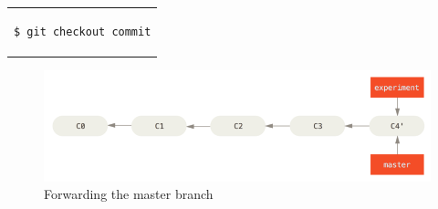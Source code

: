 \documentclass[12pt,a4paper]{article}
\begin{document}
\begin{center}
\begin{tabular}{c}
\begin{lstlisting}[language=bash]
  $ git checkout commit
\end{lstlisting}
\end{tabular}
\end{center}
If I want to do an experiment I usually create a new branch to experiment on.
\begin{center}
\begin{tabular}{c}
\begin{lstlisting}[language=bash]
$ git branch experiment
# creates a new branch called experiment
$ git checkout experiment
# checks out the experiment branch which means that
# the user is working now on this branch  
\end{lstlisting}
\end{tabular}
\end{center}
When I am happy with the experiments I made and tested them I can now reinclude those changes into the master branch. Therefore
I can rebase now the experiment branch into the master branch and merge them together \cite{GitBranch}:
\begin{center}
\begin{tabular}{c}
\begin{lstlisting}[language=bash]
$ git rebase master
# rebases the experiment branch to the master branch
$ git checkout master
# checks out the master branch
$ git merge experiment
# merges the two branches together  
\end{lstlisting}
\end{tabular}
\end{center}
\begin{figure}[H]
\begin{center}
\includegraphics[width=\textwidth]{./basic-rebase-4.png}
\caption{Forwarding the master branch \cite{GitBranch}}
\label{BasicRebase}
\end{center}
\end{figure}
\end{document}
